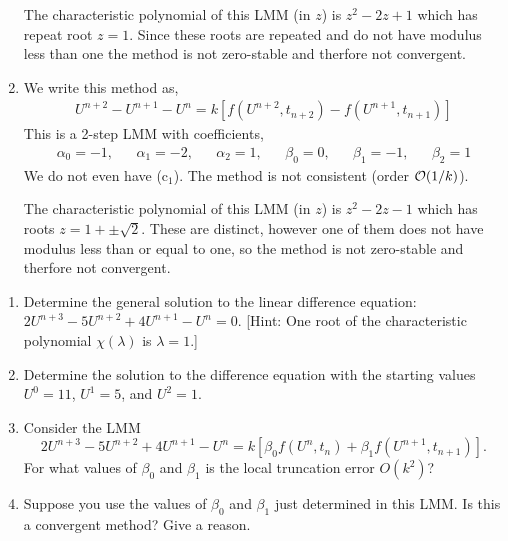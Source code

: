 \documentclass[10pt]{article}
\begin{document}
\begin{solution}[Solution]
\begin{enumerate}[label=(\alph*)]
    The characteristic polynomial of this LMM (in \( z \)) is \( z^2-2z+1 \) which has repeat root \( z = 1 \). Since these roots are repeated and do not have modulus less than one the method is not zero-stable and therfore not convergent.

    \item We write this method as,
    \begin{align*}
        U^{n+2} - U^{n+1} - U^n = k[f(U^{n+2},t_{n+2}) - f(U^{n+1},t_{n+1})]
    \end{align*}
    This is a 2-step LMM with coefficients,
    \begin{align*}
        \alpha_0 = -1, && \alpha_1 = -2, && \alpha_2 = 1,
        && \beta_0 = 0, && \beta_1 = -1, && \beta_2 = 1
    \end{align*}
    We do not even have (c$_1$). The method is not consistent (order \( \mathcal{O}(1/k) \)).

    The characteristic polynomial of this LMM (in \( z \)) is \( z^2-2z-1 \) which has roots \( z = 1+\pm\sqrt{2} \). These are distinct, however one of them does not have modulus less than or equal to one, so the method is not zero-stable  and therfore not convergent.

\end{enumerate}



\end{solution}

\begin{problem}[Problem 3]
\begin{enumerate}[label=(\alph*)]
\item
Determine the general solution to the linear difference equation:
\(2 U^{n+3} - 5 U^{n+2} + 4 U^{n+1} - U^n = 0\).  [Hint:  One root of the characteristic polynomial
\(\chi ( \lambda )\) is \(\lambda = 1\).]
\item
Determine the solution to the difference equation with the starting values \(U^0 = 11\),
\(U^1 = 5\), and \(U^2 = 1\).
\item
Consider the LMM
\[
2 U^{n+3} - 5 U^{n+2} + 4 U^{n+1} - U^n = k [ \beta_0 f( U^n , t_n ) + \beta_1 f( U^{n+1} , t_{n+1} ) ] .
\]
For what values of \(\beta_0\) and \(\beta_1\) is the local truncation error \(O( k^2 )\)?
\item
Suppose you use the values of \(\beta_0\) and \(\beta_1\) just determined in this LMM.  Is this a convergent method?  Give a reason.
\end{enumerate}
\end{problem}
\end{document}
